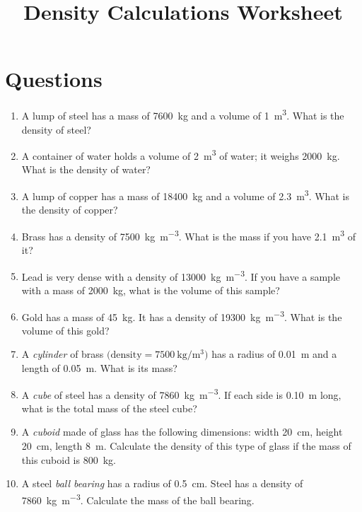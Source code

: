 \documentclass{article}
\title{Density Calculations Worksheet}
\author{}
\date{}
\begin{document}
\maketitle

\section*{Questions}

\begin{enumerate}
\item A lump of steel has a mass of \SI{7600}{\kilogram} and a volume of \SI{1}{\metre\cubed}. What is the density of steel?

\item A container of water holds a volume of \SI{2}{\metre\cubed} of water; it weighs \SI{2000}{\kilogram}. What is the density of water?

\item A lump of copper has a mass of \SI{18400}{\kilogram} and a volume of \SI{2.3}{\metre\cubed}. What is the density of copper?

\item Brass has a density of \SI{7500}{\kilogram\per\metre\cubed}. What is the mass if you have \SI{2.1}{\metre\cubed} of it?

\item Lead is very dense with a density of \SI{13000}{\kilogram\per\metre\cubed}. If you have a sample with a mass of \SI{2000}{\kilogram}, what is the volume of this sample?

\item Gold has a mass of \SI{45}{\kilogram}.  It has a density of \SI{19300}{\kilogram\per\metre\cubed}.  What is the volume of this gold?

\item A \emph{cylinder} of brass \(\bigl(\text{density} = \SI{7500}{\kilogram\per\metre\cubed}\bigr)\) has a radius of \SI{0.01}{\metre} and a length of \SI{0.05}{\metre}. What is its mass?

\item A \emph{cube} of steel has a density of \SI{7860}{\kilogram\per\metre\cubed}. If each side is \SI{0.10}{\metre} long, what is the total mass of the steel cube?

\item A \emph{cuboid} made of glass has the following dimensions: width \SI{20}{\centi\metre}, height \SI{20}{\centi\metre}, length \SI{8}{\metre}.  Calculate the density of this type of glass if the mass of this cuboid is \SI{800}{\kilogram}.

\item A steel \emph{ball bearing} has a radius of \SI{0.5}{\centi\metre}. Steel has a density of \SI{7860}{\kilogram\per\metre\cubed}. Calculate the mass of the ball bearing.

\end{enumerate}
\end{document}
